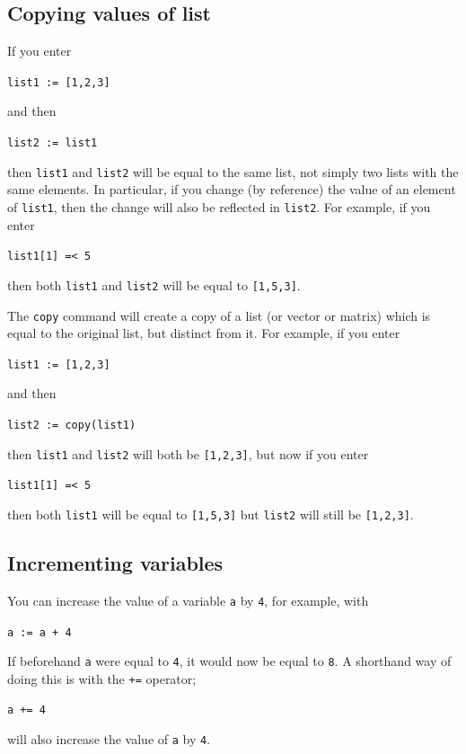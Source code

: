 \documentclass[a4paper,11pt]{book}
\begin{document}
\subsection{Copying values of list}

If you enter
\begin{center}
  {\tt list1 := [1,2,3]}
\end{center}
and then 
\begin{center}
  {\tt list2 := list1}
\end{center}
then \texttt{list1} and \texttt{list2} will be equal to the same list,
not simply two lists with the same elements.  In particular, if you
change (by reference) the value of an element of \texttt{list1}, then
the change will also be reflected in \texttt{list2}.  For example, if
you enter
\begin{center}
  {\tt list1[1] =< 5}
\end{center}
then both \texttt{list1} and \texttt{list2} will be equal to
\texttt{[1,5,3]}.

The \texttt{copy} command will create a copy of a list (or
vector or matrix) which is equal to the original list, but distinct
from it.  For example, if you enter
\begin{center}
  {\tt list1 := [1,2,3]}
\end{center}
and then 
\begin{center}
  {\tt list2 := copy(list1)}
\end{center}
then \texttt{list1} and \texttt{list2} will both be \texttt{[1,2,3]},
but now if you enter
\begin{center}
  {\tt list1[1] =< 5}
\end{center}
then both \texttt{list1} will be equal to \texttt{[1,5,3]} but
\texttt{list2} will still be \texttt{[1,2,3]}.

\subsection{Incrementing variables}

You can increase the value of a variable \texttt{a} by \texttt{4}, for
example, with
\begin{center}
  {\tt a := a + 4}
\end{center}
If beforehand \texttt{a} were equal to \texttt{4}, it would now be
equal to \texttt{8}.  A shorthand way of doing this is with the
\texttt{+=}\index{+=} operator;
\begin{center}
  {\tt a += 4}
\end{center}
will also increase the value of \texttt{a} by \texttt{4}.
\end{document}
